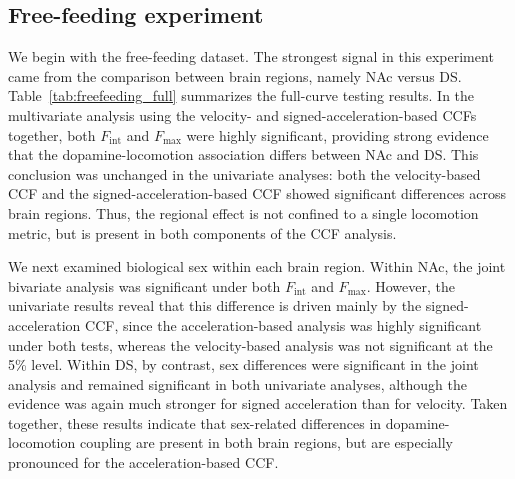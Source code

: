\documentclass[12pt]{article}
\begin{document}
\subsection{Free-feeding experiment}

We begin with the free-feeding dataset. The strongest signal in this experiment came from the comparison between brain regions, namely NAc versus DS. Table~\ref{tab:freefeeding_full} summarizes the full-curve testing results. In the multivariate analysis using the velocity- and signed-acceleration-based CCFs together, both \(F_{\mathrm{int}}\) and \(F_{\max}\) were highly significant, providing strong evidence that the dopamine-locomotion association differs between NAc and DS. This conclusion was unchanged in the univariate analyses: both the velocity-based CCF and the signed-acceleration-based CCF showed significant differences across brain regions. Thus, the regional effect is not confined to a single locomotion metric, but is present in both components of the CCF analysis.

We next examined biological sex within each brain region. Within NAc, the joint bivariate analysis was significant under both \(F_{\mathrm{int}}\) and \(F_{\max}\). However, the univariate results reveal that this difference is driven mainly by the signed-acceleration CCF, since the acceleration-based analysis was highly significant under both tests, whereas the velocity-based analysis was not significant at the 5\% level. Within DS, by contrast, sex differences were significant in the joint analysis and remained significant in both univariate analyses, although the evidence was again much stronger for signed acceleration than for velocity. Taken together, these results indicate that sex-related differences in dopamine-locomotion coupling are present in both brain regions, but are especially pronounced for the acceleration-based CCF.
\end{document}
